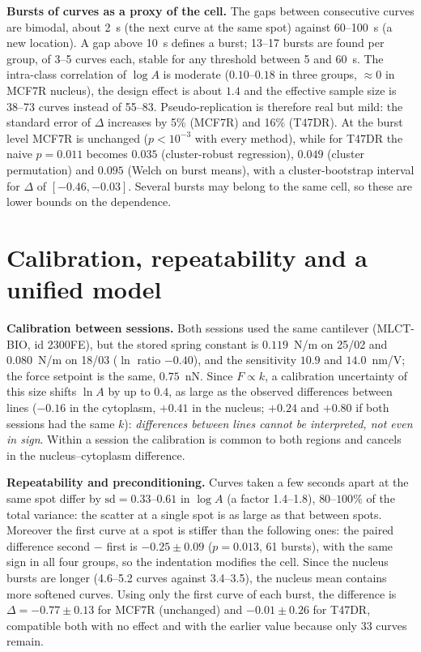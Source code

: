 \documentclass[reprint,nofootinbib,amsmath,amssymb,aps,floatfix]{revtex4-2}
\begin{document}
\textbf{Bursts of curves as a proxy of the cell.} The gaps between consecutive curves are bimodal, about 2~s (the next curve at the same spot) against 60--100~s (a new location). A gap above 10~s defines a burst; 13--17 bursts are found per group, of 3--5 curves each, stable for any threshold between 5 and 60~s. The intra-class correlation of $\log A$ is moderate ($0.10$--$0.18$ in three groups, $\approx0$ in MCF7R nucleus), the design effect is about $1.4$ and the effective sample size is 38--73 curves instead of 55--83. Pseudo-replication is therefore real but mild: the standard error of $\Delta$ increases by 5\% (MCF7R) and 16\% (T47DR). At the burst level MCF7R is unchanged ($p<10^{-3}$ with every method), while for T47DR the naive $p=0.011$ becomes $0.035$ (cluster-robust regression), $0.049$ (cluster permutation) and $0.095$ (Welch on burst means), with a cluster-bootstrap interval for $\Delta$ of $[-0.46,-0.03]$. Several bursts may belong to the same cell, so these are lower bounds on the dependence.

\section{Calibration, repeatability and a unified model}
\textbf{Calibration between sessions.} Both sessions used the same cantilever (MLCT-BIO, id 2300FE), but the stored spring constant is $0.119$~N/m on 25/02 and $0.080$~N/m on 18/03 ($\ln$ ratio $-0.40$), and the sensitivity $10.9$ and $14.0$~nm/V; the force setpoint is the same, $0.75$~nN. Since $F\propto k$, a calibration uncertainty of this size shifts $\ln A$ by up to $0.4$, as large as the observed differences between lines ($-0.16$ in the cytoplasm, $+0.41$ in the nucleus; $+0.24$ and $+0.80$ if both sessions had the same $k$): \emph{differences between lines cannot be interpreted, not even in sign}. Within a session the calibration is common to both regions and cancels in the nucleus--cytoplasm difference.

\textbf{Repeatability and preconditioning.} Curves taken a few seconds apart at the same spot differ by $\mathrm{sd}=0.33$--$0.61$ in $\log A$ (a factor 1.4--1.8), $80$--$100\%$ of the total variance: the scatter at a single spot is as large as that between spots. Moreover the first curve at a spot is stiffer than the following ones: the paired difference second $-$ first is $-0.25\pm0.09$ ($p=0.013$, 61 bursts), with the same sign in all four groups, so the indentation modifies the cell. Since the nucleus bursts are longer (4.6--5.2 curves against 3.4--3.5), the nucleus mean contains more softened curves. Using only the first curve of each burst, the difference is $\Delta=-0.77\pm0.13$ for MCF7R (unchanged) and $-0.01\pm0.26$ for T47DR, compatible both with no effect and with the earlier value because only 33 curves remain.
\end{document}
